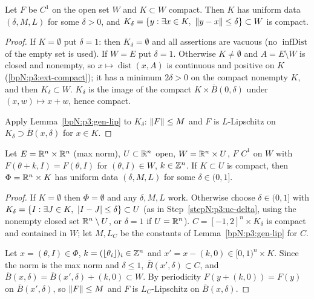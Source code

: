 \begin{lemma}\label{bpN:p3:gen-uniform-compact}
Let $F$ be $C^1$ on the open set $W$ and $K\subset W$ compact. Then $K$ has uniform data $(\delta,M,L)$ for some
$\delta>0$, and $K_\delta=\{y:\exists x\in K,\ \norm{y-x}\le\delta\}\subset W$ is compact.
\end{lemma}
\begin{proof}
\label{stepN:p3:uc-delta} If $K=\emptyset$ put $\delta=1$: then $K_\delta=\emptyset$ and all assertions are vacuous
(no $\operatorname{infDist}$ of the empty set is used). If $W=E$ put $\delta=1$. Otherwise $K\ne\emptyset$ and $A=E\setminus W$ is closed and nonempty, so
$x\mapsto\operatorname{dist}(x,A)$ is continuous and positive on $K$ (\ref{bpN:p3:ext-compact}); it has a minimum $2\delta>0$ on the compact nonempty $K$, and then $K_\delta\subset W$.
$K_\delta$ is the image of the compact $K\times\overline B(0,\delta)$ under $(x,w)\mapsto x+w$, hence compact.

\label{stepN:p3:uc-data} Apply Lemma~\ref{bpN:p3:gen-lip} to $K_\delta$: $\lVert F\rVert\le M$ and $F$ is $L$-Lipschitz on $K_\delta\supset\overline B(x,\delta)$ for $x\in K$.
\end{proof}

\begin{lemma}\label{bpN:p3:gen-uniform-periodic}
Let $E=\mathbb{R}^n\times\mathbb{R}^n$ (max norm), $U\subset\mathbb{R}^n$ open, $W=\mathbb{R}^n\times U$, $F$ $C^1$ on $W$ with
$F(\theta+k,I)=F(\theta,I)$ for $(\theta,I)\in W$, $k\in\mathbb{Z}^n$. If $K\subset U$ is compact, then $\Phi=\mathbb{R}^n\times K$ has
uniform data $(\delta,M,L)$ for some $\delta\in(0,1]$.
\end{lemma}
\begin{proof}
\label{stepN:p3:up-cell} If $K=\emptyset$ then $\Phi=\emptyset$ and any $\delta,M,L$ work. Otherwise choose $\delta\in(0,1]$ with $K_\delta=\{I:\exists J\in K,\ \abs{I-J}\le\delta\}\subset U$ (as in
Step~\ref{stepN:p3:uc-delta}, using the nonempty closed set $\mathbb{R}^n\setminus U$, or $\delta=1$ if $U=\mathbb{R}^n$). $C=[-1,2]^n\times K_\delta$ is compact and contained in $W$; let $M,L_C$ be the constants of
Lemma~\ref{bpN:p3:gen-lip} for $C$.

\label{stepN:p3:up-translate} Let $x=(\theta,I)\in\Phi$, $k=(\lfloor\theta_i\rfloor)_i\in\mathbb{Z}^n$ and $x'=x-(k,0)\in[0,1)^n\times K$. Since the norm is the max
norm and $\delta\le1$, $\overline B(x',\delta)\subset C$, and $\overline B(x,\delta)=\overline B(x',\delta)+(k,0)\subset W$.
By periodicity $F(y+(k,0))=F(y)$ on $\overline B(x',\delta)$, so $\lVert F\rVert\le M$ and $F$ is $L_C$-Lipschitz on $\overline B(x,\delta)$.
\end{proof}

